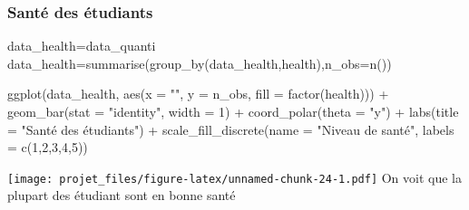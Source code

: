 \documentclass[
]{article}
\newenvironment{Shaded}{\begin{snugshade}}{\end{snugshade}}
\newcommand{\AttributeTok}[1]{\textcolor[rgb]{0.77,0.63,0.00}{#1}}
\newcommand{\DecValTok}[1]{\textcolor[rgb]{0.00,0.00,0.81}{#1}}
\newcommand{\FunctionTok}[1]{\textcolor[rgb]{0.00,0.00,0.00}{#1}}
\newcommand{\NormalTok}[1]{#1}
\newcommand{\OtherTok}[1]{\textcolor[rgb]{0.56,0.35,0.01}{#1}}
\newcommand{\SpecialCharTok}[1]{\textcolor[rgb]{0.00,0.00,0.00}{#1}}
\newcommand{\StringTok}[1]{\textcolor[rgb]{0.31,0.60,0.02}{#1}}
\begin{document}
\hypertarget{santuxe9-des-uxe9tudiants}{%
\subsubsection{Santé des étudiants}\label{santuxe9-des-uxe9tudiants}}

\begin{Shaded}
\begin{Highlighting}[]
\NormalTok{data\_health}\OtherTok{=}\NormalTok{data\_quanti}
\NormalTok{data\_health}\OtherTok{=}\FunctionTok{summarise}\NormalTok{(}\FunctionTok{group\_by}\NormalTok{(data\_health,health),}\AttributeTok{n\_obs=}\FunctionTok{n}\NormalTok{())}


\FunctionTok{ggplot}\NormalTok{(data\_health, }\FunctionTok{aes}\NormalTok{(}\AttributeTok{x =} \StringTok{""}\NormalTok{, }\AttributeTok{y =}\NormalTok{ n\_obs, }\AttributeTok{fill =} \FunctionTok{factor}\NormalTok{(health))) }\SpecialCharTok{+}
  \FunctionTok{geom\_bar}\NormalTok{(}\AttributeTok{stat =} \StringTok{"identity"}\NormalTok{, }\AttributeTok{width =} \DecValTok{1}\NormalTok{) }\SpecialCharTok{+}
  \FunctionTok{coord\_polar}\NormalTok{(}\AttributeTok{theta =} \StringTok{"y"}\NormalTok{) }\SpecialCharTok{+}
  \FunctionTok{labs}\NormalTok{(}\AttributeTok{title =} \StringTok{"Santé des étudiants"}\NormalTok{) }\SpecialCharTok{+}
  \FunctionTok{scale\_fill\_discrete}\NormalTok{(}\AttributeTok{name =} \StringTok{"Niveau de santé"}\NormalTok{, }\AttributeTok{labels =} \FunctionTok{c}\NormalTok{(}\DecValTok{1}\NormalTok{,}\DecValTok{2}\NormalTok{,}\DecValTok{3}\NormalTok{,}\DecValTok{4}\NormalTok{,}\DecValTok{5}\NormalTok{))}
\end{Highlighting}
\end{Shaded}

\texttt{[image: projet\_files/figure-latex/unnamed-chunk-24-1.pdf]} On
voit que la plupart des étudiant sont en bonne santé

\begin{Shaded}
\end{Shaded}
\end{document}
